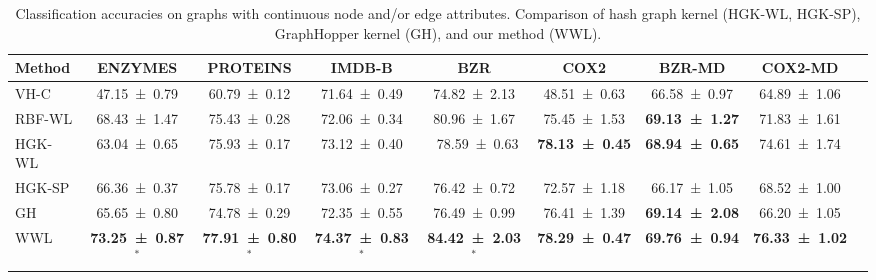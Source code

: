 \documentclass{article}
\begin{document}
\begin{table}[t]
\centering
\caption{Classification accuracies on graphs with continuous node and/or edge attributes. Comparison of hash graph kernel (HGK-WL, HGK-SP), GraphHopper kernel (GH), and our method (WWL).}
\label{results_cont}

  \renewrobustcmd{\boldmath}{}
\begin{sc}
 \setlength{\tabcolsep}{2.25pt}
 \fontsize{9}{10}\selectfont
    \begin{tabular}{lcccccccc}
        \toprule
        Method & ENZYMES           & PROTEINS         &  IMDB-B & BZR & COX2 & BZR-MD & COX2-MD\\
        \midrule
VH-C & \num{47.15 \pm 0.79}\phantom{$^\ast$} & \num{60.79 \pm 0.12}\phantom{$^\ast$} & \num{71.64 \pm 0.49}\phantom{$^\ast$} & \num{74.82 \pm 2.13}\phantom{$^\ast$} & \num{48.51 \pm 0.63} & \num{66.58 \pm 0.97} & \num{64.89 \pm 1.06}  \\
RBF-WL  & \num{68.43 \pm 1.47}\phantom{$^\ast$} & \num{75.43 \pm 0.28}\phantom{$^\ast$} & \num{72.06 \pm 0.34}\phantom{$^\ast$} & \num{80.96 \pm 1.67}\phantom{$^\ast$} &\num{75.45 \pm 1.53} &  \bfseries{\num{69.13 \pm 1.27}} & \num{71.83 \pm 1.61}\\
\midrule
HGK-WL  & \num{63.04 \pm 0.65}\phantom{$^\ast$} & \num{75.93 \pm 0.17}\phantom{$^\ast$} & \num{73.12 \pm 0.40}\phantom{$^\ast$} & \ \num{78.59 \pm 0.63}\phantom{$^\ast$} & \bfseries{\num{78.13 \pm 0.45}}  &   \bfseries{\num{68.94 \pm 0.65}} & \num{74.61 \pm 1.74} \\
HGK-SP  & \num{66.36 \pm 0.37}\phantom{$^\ast$} & \num{75.78 \pm 0.17}\phantom{$^\ast$} & \num{73.06 \pm 0.27}\phantom{$^\ast$} & \num{76.42 \pm 0.72}\phantom{$^\ast$} & \num{72.57 \pm 1.18}  & \num{66.17 \pm 1.05} & \num{68.52 \pm 1.00} \\
\midrule
GH      & \num{65.65\pm 0.80}\phantom{$^\ast$}  & \num{74.78\pm 0.29}\phantom{$^\ast$}  & \num{72.35 \pm 0.55}\phantom{$^\ast$} & \num{76.49 \pm 0.99}\phantom{$^\ast$} & \num{76.41 \pm 1.39} &  \bfseries{\num{69.14 \pm 2.08}} &  \num{66.20 \pm 1.05} \\
\midrule
WWL     & \bfseries\num{73.25\pm 0.87}$^\ast$ & \bfseries\num{77.91 \pm  0.80}$^\ast$  & \bfseries\num{74.37 \pm 0.83}$^\ast$ &  \bfseries\num{84.42 \pm 2.03}$^\ast$ & \bfseries{\num{78.29 \pm 0.47}} & \bfseries{\num{69.76 \pm 0.94}} & \bfseries\num{76.33 \pm 1.02} \\ 
        \bottomrule
    \end{tabular}
\end{sc}
\end{table}
\end{document}
